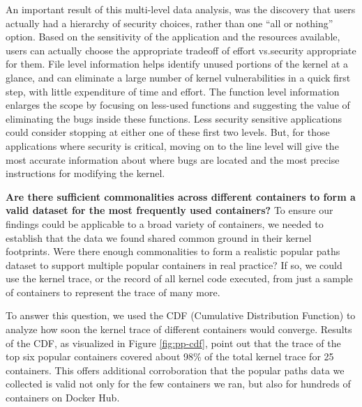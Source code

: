 An important result of this multi-level data analysis, was the discovery that users actually had a hierarchy of security choices, rather than one ``all or nothing'' option. 
Based on the sensitivity of the application and the resources available, users can actually choose the appropriate tradeoff of effort vs.security appropriate for them. 
File level information helps identify unused portions of the kernel at a glance, and can eliminate a large number of kernel vulnerabilities in a quick first step, 
with little expenditure of time and effort. The function level information enlarges the scope by focusing on less-used functions and suggesting the value of eliminating the bugs inside these functions. 
Less security sensitive applications could consider stopping at either one of these first two levels. 
But, for those applications where security is critical, moving on to the line level will give the most accurate information about where bugs are located and the most precise instructions for modifying the kernel.

\noindent
\textbf{Are there sufficient commonalities across different containers to form a valid dataset for the most frequently used  containers? } 
\newline
To ensure our findings could be applicable to a broad variety of containers, we needed to establish that the data we found shared  common ground in their kernel footprints. 
Were there enough commonalities to form a realistic popular paths dataset to support multiple popular containers in real practice? 
If so, we could use  the kernel trace, or the record of all kernel code executed, from just a sample of containers to represent the trace of many more. 

To answer this question, we used the CDF (Cumulative Distribution Function) to analyze how soon the kernel trace of different containers would converge. 
Results of the CDF, as visualized in Figure \ref{fig:pp-cdf}, point out that the trace of the top six popular containers covered about 98\% of the total kernel trace for 25 containers. 
This offers additional corroboration that the popular paths data we collected is valid not only for the few containers we ran, but also for hundreds of containers on Docker Hub.  

